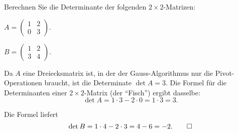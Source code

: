 Berechnen Sie die Determinante der folgenden $2\times 2$-Matrizen:
\begin{teilaufgaben}
\item $A=\begin{pmatrix} 1&2\\0&3\end{pmatrix}$.
\item $B=\begin{pmatrix} 1&2\\3&4\end{pmatrix}$.
\end{teilaufgaben}


\begin{loesung}
\begin{teilaufgaben}
\item Da $A$ eine Dreiecksmatrix ist, in der der Gauss-Algorithmus nur
die Pivot-Operationen braucht, ist die Determinate $\det A=3$.
Die Formel für die Determinanten einer $2\times 2$-Matrix (der ``Fisch'')
ergibt dasselbe:
\[
\det A
=
1\cdot 3 - 2\cdot 0=1\cdot 3 = 3.
\]
\item
Die Formel liefert
\[
\det B
=
1\cdot 4 - 2\cdot 3 = 4-6=-2.
\qedhere
\]
\end{teilaufgaben}
\end{loesung}
